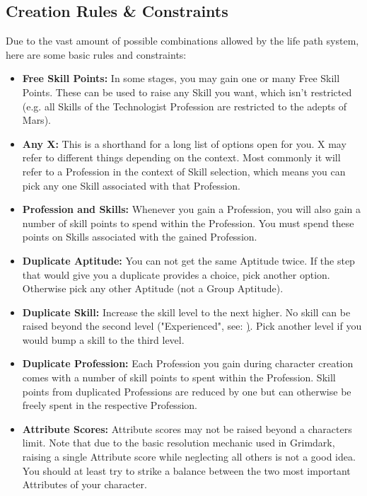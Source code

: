 \subsection{Creation Rules \& Constraints}
Due to the vast amount of possible combinations allowed by the life path system, here are some basic rules and constraints:
\begin{itemize}
	\item \textbf{Free Skill Points:} In some stages, you may gain one or many Free Skill Points. These can be used to raise any Skill you want, which isn't restricted (e.g. all Skills of the Technologist Profession are restricted to the adepts of Mars).
	\item \textbf{Any X:} This is a shorthand for a long list of options open for you. X may refer to different things depending on the context. Most commonly it will refer to a Profession in the context of Skill selection, which means you can pick any one Skill associated with that Profession.
	\item \textbf{Profession and Skills:} Whenever you gain a Profession, you will also gain a number of skill points to spend within the Profession. You must spend these points on Skills associated with the gained Profession.
	\item \textbf{Duplicate Aptitude:} You can not get the same Aptitude twice. If the step that would give you a duplicate provides a choice, pick another option. Otherwise pick any other Aptitude (not a Group Aptitude).
	\item \textbf{Duplicate Skill:} Increase the skill level to the next higher. No skill can be raised beyond the second level ("Experienced", see: \href{skill_level}). Pick another level if you would bump a skill to the third level.
	\item \textbf{Duplicate Profession:} Each Profession you gain during character creation comes with a number of skill points to spent within the Profession. Skill points from duplicated Professions are reduced by one but can otherwise be freely spent in the respective Profession.
	\item \textbf{Attribute Scores:} Attribute scores may not be raised beyond a characters limit. Note that due to the basic resolution mechanic used in Grimdark, raising a single Attribute score while neglecting all others is not a good idea. You should at least try to strike a balance between the two most important Attributes of your character.

\end{itemize}

